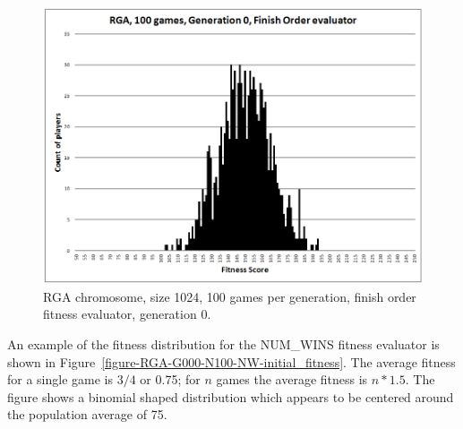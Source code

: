 \begin{figure}
\begin{minipage}[t]{0.47\linewidth}
\includegraphics[width=1.0\linewidth]{Figures/RGA_1024_G000_N100_FO.png}
\caption[RGA Finish Order Fitness Distribution, Initial Generation]{RGA
chromosome, size 1024, 100 games per generation, finish order
fitness evaluator, generation 0.}
\label{figure-RGA-G000-N100-FO-initial_fitness}
\end{minipage}
\end{figure}

An example of the fitness distribution for the NUM\_WINS fitness evaluator is
shown in Figure~\ref{figure-RGA-G000-N100-NW-initial_fitness}. The average
fitness for a single game is \(3/4\) or 0.75; for \(n\) games the average
fitness is \(n * 1.5\). The figure shows a binomial shaped distribution which
appears to be centered around the population average of 75.

